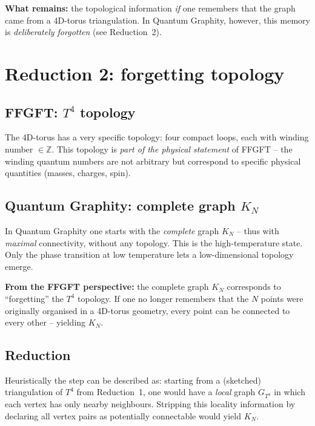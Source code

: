 \textbf{What remains:} the topological information \emph{if} one
remembers that the graph came from a 4D-torus triangulation. In
Quantum Graphity, however, this memory is \emph{deliberately
forgotten} (see Reduction~2).

\section{Reduction 2: forgetting topology}

\subsection{\texorpdfstring{FFGFT: $T^4$ topology}{FFGFT: T4 topology}}

The 4D-torus has a very specific topology: four compact loops, each
with winding number $\in \mathbb{Z}$. This topology is \emph{part of
the physical statement} of FFGFT -- the winding quantum numbers are
not arbitrary but correspond to specific physical quantities
(masses, charges, spin).

\subsection{\texorpdfstring{Quantum Graphity: complete graph $K_N$}{Quantum Graphity: complete graph KN}}

In Quantum Graphity one starts with the \emph{complete} graph $K_N$
-- thus with \emph{maximal} connectivity, without any topology. This
is the high-temperature state. Only the phase transition at low
temperature lets a low-dimensional topology emerge.

\textbf{From the FFGFT perspective:} the complete graph $K_N$
corresponds to \enquote{forgetting} the $T^4$ topology. If one no
longer remembers that the $N$ points were originally organised in a
4D-torus geometry, every point can be connected to every other --
yielding $K_N$.

\subsection{Reduction}

Heuristically the step can be described as: starting from a
(sketched) triangulation of $T^4$ from Reduction~1, one would have a
\emph{local} graph $G_{T^4}$ in which each vertex has only nearby
neighbours. Stripping this locality information by declaring all
vertex pairs as potentially connectable would yield $K_N$.

